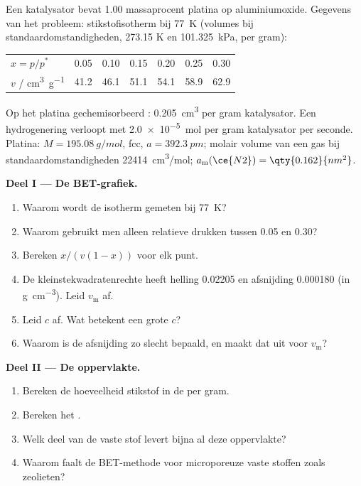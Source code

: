 \begin{problem}
\label{pb:b3:surfaces-catalysis:1}
Een katalysator bevat 1.00 massaprocent platina op aluminiumoxide.
Gegevens van het probleem: stikstofisotherm bij \qty{77}{K} (volumes bij
standaardomstandigheden, 273.15 K en
\qty{101.325}{kPa}, per gram):
\begin{center}\small
\begin{tabular}{lcccccc}
\hline
$x = p/p^*$ & 0.05 & 0.10 & 0.15 & 0.20 & 0.25 & 0.30 \\
$v$ / \unit{cm^3.g^{-1}} & 41.2 & 46.1 & 51.1 & 54.1 & 58.9 & 62.9 \\ \hline
\end{tabular}
\end{center}
Op het platina gechemisorbeerd : \qty{0.205}{cm^3} per gram
katalysator. Een hydrogenering
verloopt met \qty{2.0e-5}{mol} per gram katalysator per seconde. Platina: $M = \qty{195.08}{g/mol}$, fcc,
$a = \qty{392.3}{pm}$; molair volume van een gas bij
standaardomstandigheden \qty{22414}{cm^3/mol};
$a_{\mathrm m}(\ce{N2}) = \qty{0.162}{nm^2}$.

\medskip\noindent\textbf{Deel I --- De BET-grafiek.}
\begin{enumerate}
  \item Waarom wordt de isotherm gemeten bij \qty{77}{K}?
  \item Waarom gebruikt men alleen relatieve drukken tussen 0.05 en 0.30?
  \item Bereken $x/(v(1 - x))$ voor elk punt.
  \item De kleinstekwadratenrechte heeft helling \num{0.02205} en afsnijding
        \num{0.000180} (in
        \unit{g.cm^{-3}}). Leid $v_{\mathrm m}$ af.
  \item Leid $c$ af. Wat betekent een grote $c$?
  \item Waarom is de afsnijding zo slecht bepaald, en maakt dat uit voor
        $v_{\mathrm m}$?
\end{enumerate}

\medskip\noindent\textbf{Deel II --- De oppervlakte.}
\begin{enumerate}[resume]
  \item Bereken de hoeveelheid stikstof in de  per gram.
  \item Bereken het .
  \item Welk deel van de vaste stof levert bijna al deze oppervlakte?
  \item Waarom faalt de BET-methode voor microporeuze vaste stoffen zoals
        zeolieten?
\end{enumerate}


\end{problem}
